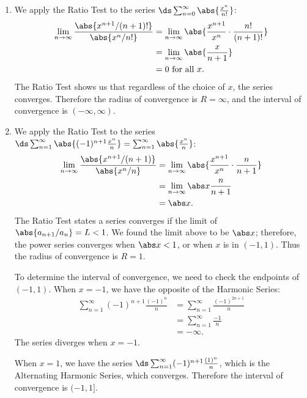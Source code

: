 {\begin{enumerate}
	\item We apply the Ratio Test to the series $\ds \sum_{n=0}^\infty \abs{\frac{x^n}{n!}}$:
		\begin{align*}
		\lim_{n\to\infty} \frac{\abs{x^{n+1}/(n+1)!}}{\abs{x^n/n!}} &= \lim_{n\to\infty} \abs{\frac{x^{n+1}}{x^n}\cdot\frac{n!}{(n+1)!}}\\
			&= \lim_{n\to\infty} \abs{\frac x{n+1}}\\
			&= 0 \text{ for all } x.
		\end{align*}
		The Ratio Test shows us that regardless of the choice of $x$, the series converges. Therefore the radius of convergence is $R=\infty$, and the interval of convergence is $(-\infty,\infty)$.
		
	\item		We apply the Ratio Test to the series $\ds \sum_{n=1}^\infty \abs{(-1)^{n+1}\frac{x^n}{n}} = \sum_{n=1}^\infty \abs{\frac{x^n}{n}}$:
	\begin{align*}
	\lim_{n\to\infty} \frac{\abs{x^{n+1}/(n+1)}}{\abs{x^n/n}} &= \lim_{n\to\infty} \abs{\frac{x^{n+1}}{x^n}\cdot \frac{n}{n+1}} \\
			&= \lim_{n\to\infty} \abs x\frac{n}{n+1}\\
			&= \abs x.
	\end{align*}
	The Ratio Test states a series converges if the limit of $\abs{a_{n+1}/a_n} = L<1$. We found the limit above to be $\abs x$; therefore, the power series converges when $\abs x<1$, or when $x$ is in $(-1,1)$. Thus the radius of convergence is $R=1$.
	
	To determine the interval of convergence, we need to check the endpoints of $(-1,1)$. When $x=-1$, we have the opposite of the Harmonic Series:
	\begin{align*}
	\sum_{n=1}^\infty (-1)^{n+1}\frac{(-1)^n}{n}
	&= \sum_{n=1}^\infty \frac{(-1)^{2n+1}}{n}\\
	&= \sum_{n=1}^\infty \frac{-1}{n}\\
	&= -\infty.
	\end{align*}
	The series diverges when $x=-1$.
	
	When $x=1$, we have the series $\ds \sum_{n=1}^\infty (-1)^{n+1}\frac{(1)^n}{n}$, which is the Alternating Harmonic Series, which converges. Therefore the interval of convergence is $(-1,1]$.
	

\end{enumerate}}
